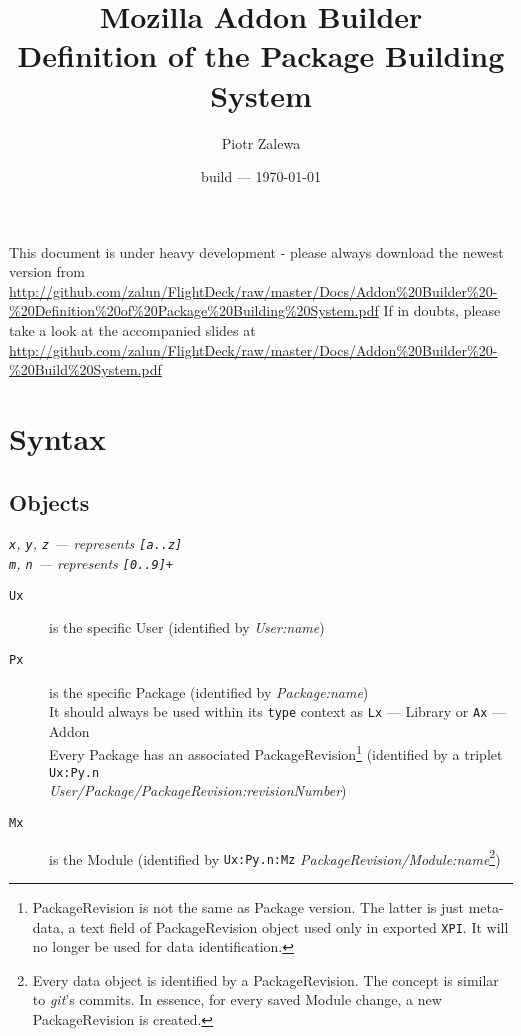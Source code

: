 \documentclass[10pt]{article}
\title{Mozilla Addon Builder\\ Definition of the Package Building System}
\author{Piotr Zalewa}
\date{build --- \today}
\def\xpi{{\tt XPI}}
\begin{document}
\maketitle


{\scriptsize
	\noindent This document is under heavy development - please always download the newest version from \\
\url{http://github.com/zalun/FlightDeck/raw/master/Docs/Addon\%20Builder\%20-\%20Definition\%20of\%20Package\%20Building\%20System.pdf}
}{\scriptsize
	\noindent If in doubts, please take a look at the accompanied slides at \\
	\url{http://github.com/zalun/FlightDeck/raw/master/Docs/Addon\%20Builder\%20-\%20Build\%20System.pdf}
}
\section{Syntax}

	\subsection{Objects}
	
	{\em \small {\tt x}, {\tt y}, {\tt z} --- represents {\tt [a..z]}\\
	{\tt m}, {\tt n} --- represents {\tt [0..9]+}}
	
	\begin{description}
		\item[{\tt Ux}] is the specific User (identified by {\em User:name})
		\item[{\tt Px}] is the specific Package (identified by {\em Package:name})\\
			It should always be used within its {\tt type} context as {\tt Lx} --- Library or {\tt Ax} --- 
			Addon\\
			Every Package has an associated PackageRevision\footnote{PackageRevision is not the same as 
			Package version. The latter is just meta-data, a text field of PackageRevision object used only 
			in exported \xpi. It will no longer be used for data identification.} (identified by a triplet 
			{\tt Ux:Py.n} \\{\em User/Package/PackageRevision:revisionNumber})
		\item[{\tt Mx}] is the Module (identified by {\tt Ux:Py.n:Mz} 
		{\em PackageRevision/Module:name}\footnote{Every data object is identified by a PackageRevision. 
		The concept is similar to {\em git}'s commits. In essence, for every saved Module change, a new 
		PackageRevision is created.})
	\end{description}
\end{document}
